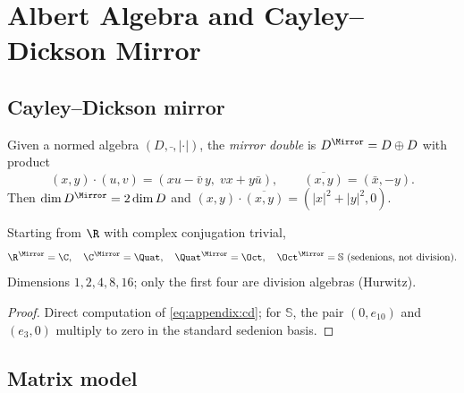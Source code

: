 \appendix
\section{Albert Algebra and Cayley--Dickson Mirror}
\label{sec:appendix}

\subsection{Cayley--Dickson mirror}
\label{sec:appendix:cayley}

\begin{definition}\label{def:appendix:cd}
Given a normed algebra $(D,\bar{\ },|\cdot|)$, the \emph{mirror double} is
$D^{\Mirror}=D\oplus D$ with product
\begin{equation}\label{eq:appendix:cd}
  (x,y)\cdot(u,v)=(xu-\bar v\,y,\;vx+y\bar u),
  \qquad \overline{(x,y)}=(\bar x,-y).
\end{equation}
Then $\dim D^{\Mirror}=2\dim D$ and $(x,y)\cdot\overline{(x,y)}=(|x|^2+|y|^2,0)$.
\end{definition}

\begin{proposition}\label{prop:appendix:cdchain}
Starting from $\R$ with complex conjugation trivial,
\begin{equation}
  \R^{\Mirror}=\C,\quad
  \C^{\Mirror}=\Quat,\quad
  \Quat^{\Mirror}=\Oct,\quad
  \Oct^{\Mirror}=\mathbb{S}\ (\text{sedenions, not division}).
\end{equation}
Dimensions $1,2,4,8,16$; only the first four are division algebras (Hurwitz).
\end{proposition}

\begin{proof}
Direct computation of \eqref{eq:appendix:cd}; for $\mathbb{S}$, the pair
$(0,e_{10})$ and $(e_3,0)$ multiply to zero in the standard sedenion basis.
\end{proof}

\subsection{Matrix model}
\label{sec:appendix:matrix}

